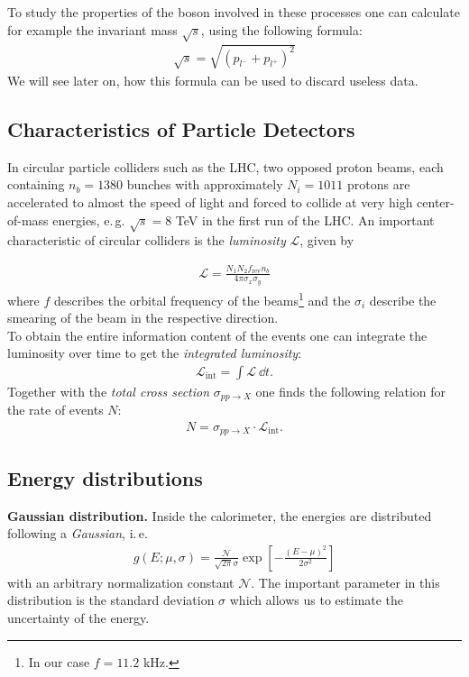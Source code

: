 \documentclass[twocolumn,
			   showpacs,%
               nofootinbib,
               aps,%
               prd,
               notitlepage,
               showkeys,
               10pt]{revtex4-1}
\begin{document}
To study the properties of the boson involved in these processes one can calculate for example the invariant mass $\sqrt{s}$, using the following formula:
\begin{align}
	\sqrt{s} = \sqrt{\left(p_{l^{-}} + p_{l^{+}}\right)^2}
\end{align}
We will see later on, how this formula can be used to discard useless data.
\subsection{Characteristics of Particle Detectors}
In circular particle colliders such as the LHC, two opposed proton beams, each containing $n_b = 1380$ bunches with approximately $N_i = 1011$ protons are accelerated to almost the speed of light and forced to collide at very high center-of-mass energies, e.\,g. $\sqrt{s} = 8$ TeV in the first run of the LHC. An important characteristic of circular colliders is the \textit{luminosity} $\mathcal{L}$, given by

\begin{align}
\mathcal{L} = \frac{N_1N_2f_{\text{rev}}n_b}{4\pi\sigma_x\sigma_y}
\end{align}
where $f$ describes the orbital frequency of the beams\footnote{In our case $f = 11.2$ kHz.} and the $\sigma_i$ describe the smearing of the beam in the respective direction.\\ %
To obtain the entire information content of the events one can integrate the luminosity over time to get the \textit{integrated luminosity}:
\begin{align}
\mathcal{L}_{\text{int}} = \int \mathcal{L} \ \dd t.
\end{align}
Together with the \textit{total cross section} $\sigma_{pp\rightarrow X}$ one finds the following relation for the rate of events $N$: 
\begin{align}
N = \sigma_{pp\rightarrow X} \cdot \mathcal{L}_{\text{int}}.
\end{align}

\subsection{Energy distributions}
\textbf{Gaussian distribution.} Inside the calorimeter, the energies are distributed following a \textit{Gaussian}, i.\,e. 
\begin{align}
g(E ; \mu, \sigma)=\frac{\mathcal{N}}{\sqrt{2 \pi} \sigma} \exp \left[-\frac{(E-\mu)^{2}}{2 \sigma^{2}}\right]
\label{eqn:Gaussian}
\end{align}
with an arbitrary normalization constant $\mathcal{N}$. The important parameter in this distribution is the standard deviation $\sigma$ which allows us to estimate the uncertainty of the energy.\\
\end{document}
